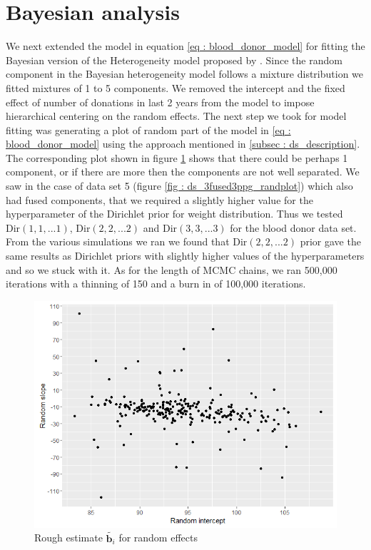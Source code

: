 \section{Bayesian analysis}
\label{sec : blood_donor_bayesian_analysis}
We next extended the model in equation \ref{eq : blood_donor_model} for fitting the Bayesian version of the Heterogeneity model proposed by \citet{verbeke_linear_1996}. Since the random component in the Bayesian heterogeneity model follows a mixture distribution we fitted mixtures of 1 to 5 components. We removed the intercept and the fixed effect of number of donations in last 2 years from the model to impose hierarchical centering on the random effects. The next step we took for model fitting was generating a plot of random part of the model in \ref{eq : blood_donor_model} using the approach mentioned in \ref{subsec : ds_description}. The corresponding plot shown in figure \ref{fig : rough_idea_blood_donor} shows that there could be perhaps 1 component, or if there are more then the components are not well separated. We saw in the case of data set 5 (figure \ref{fig : ds_3fused3ppg_randplot}) which also had fused components, that we required a slightly higher value for the hyperparameter of the Dirichlet prior for weight distribution. Thus we tested $\text{Dir}(1, 1,...1)$, $\text{Dir}(2, 2,...2)$ and $\text{Dir}(3, 3,...3)$ for the blood donor data set. From the various simulations we ran we found that $\text{Dir}(2, 2,...2)$ prior gave the same results as Dirichlet priors with slightly higher values of the hyperparameters and so we stuck with it. As for the length of MCMC chains, we ran 500,000 iterations with a thinning of 150 and a burn in of 100,000 iterations.\\

\begin{figure}
	\centering
	\includegraphics[scale=0.5]{mainmatter/chapter_6_blood_donor/rough_estimate_random_effects.png}
	\caption{Rough estimate $\tilde{\boldsymbol{b}_i}$ for random effects}
	\label{fig : rough_idea_blood_donor}
\end{figure}

